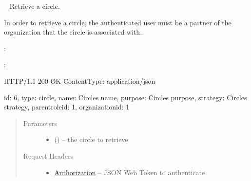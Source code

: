 \documentclass[letterpaper,10pt,english]{sphinxmanual}
\begin{document}
\begin{fulllineitems}
\label{\detokenize{resources/circle:get--circles-(circle_id)}}~
Retrieve a circle.

In order to retrieve a circle, the authenticated user must be a
partner of the organization that the circle is associated with.

:

\begin{sphinxVerbatim}[commandchars=\\\{\}]
  
 
 
\end{sphinxVerbatim}

:

\begin{sphinxVerbatim}[commandchars=\\\{\}]
HTTP/1.1 200 OK
Content\PYGZhy{}Type: application/json

\PYGZob{}
    \PYGZsq{}id\PYGZsq{}: 6,
    \PYGZsq{}type\PYGZsq{}: \PYGZsq{}circle\PYGZsq{},
    \PYGZsq{}name\PYGZsq{}: \PYGZsq{}Circle\PYGZsq{}s name\PYGZsq{},
    \PYGZsq{}purpose\PYGZsq{}: \PYGZsq{}Circle\PYGZsq{}s purpose\PYGZsq{},
    \PYGZsq{}strategy\PYGZsq{}: \PYGZsq{}Circle\PYGZsq{}s strategy\PYGZsq{},
    \PYGZsq{}parent\PYGZus{}role\PYGZus{}id\PYGZsq{}: 1,
    \PYGZsq{}organization\PYGZus{}id\PYGZsq{}: 1
\PYGZcb{}
\end{sphinxVerbatim}
\begin{quote}\begin{description}
\item[{Parameters}] \leavevmode\begin{itemize}
\item {} 
 () -- the circle to retrieve

\end{itemize}

\item[{Request Headers}] \leavevmode\begin{itemize}
\item {} 
\href{http://tools.ietf.org/html/rfc7235\#section-4.2}{Authorization} -- JSON Web Token to authenticate


\end{itemize}
\end{description}
\end{quote}
\end{fulllineitems}
\end{document}
